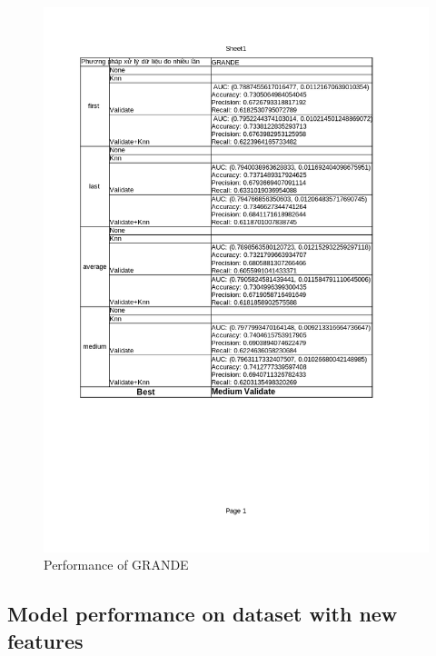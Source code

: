 \documentclass[../main.tex]{subfiles}
\begin{document}
 \begin{figure}[H]
    \centering
    \includegraphics[width=\textwidth]{Figure/KidneyResultNoLimit-new_GRANDE.png}
    \caption{Performance of GRANDE}
    \label{fig:KidneyResultNoLimit-new_GRANDE}
\end{figure}


\subsection{Model performance on dataset with new features}
\end{document}
